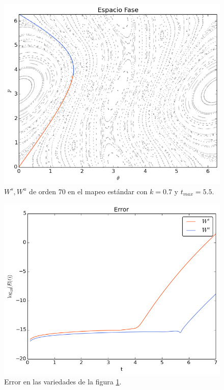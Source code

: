 \begin{figure}[H]
\centering
\includegraphics[scale=0.6]{estandark07}
\caption{$W^{s},W^{u}$ de orden 70 en el mapeo estándar con $k=0.7$ y $t_{max}=5.5$.}
\label{estandar07}
\end{figure}

\begin{figure}[H]
\centering
\includegraphics[scale=0.6]{error_est_k07} 
\caption{Error en las variedades de la figura \ref{estandar07}.}
\label{error est k07}
\end{figure}


